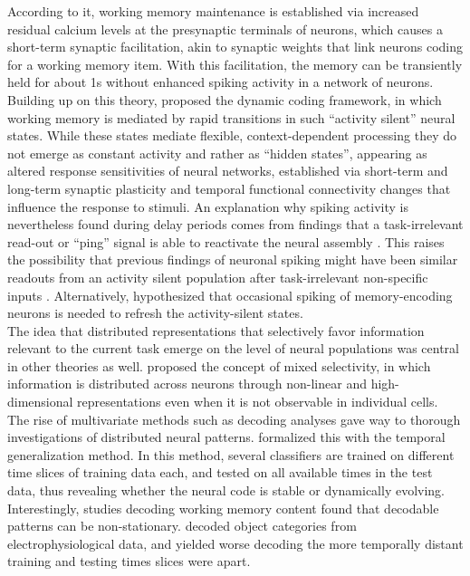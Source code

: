 According to it, working memory maintenance is established via increased residual calcium levels at the presynaptic terminals of neurons, which causes a short-term synaptic facilitation, akin to synaptic weights that link neurons coding for a working memory item.
With this facilitation, the memory can be transiently held for about 1s without enhanced spiking activity in a network of neurons.
Building up on this theory,  \citet{stokes2015activity} proposed the dynamic coding framework, in which working memory is mediated by rapid transitions in such ``activity silent'' neural states.
While these states mediate flexible, context-dependent processing they do not emerge as constant activity and rather as ``hidden states'', appearing as altered response sensitivities of neural networks, established via short-term and long-term synaptic plasticity and temporal functional connectivity changes that influence the response to stimuli.
An explanation why spiking activity is nevertheless found during delay periods comes from findings that a task-irrelevant read-out or ``ping'' signal is able to reactivate the neural assembly \citep{trubutschek2017theory}.
This raises the possibility that previous findings of neuronal spiking might have been similar readouts from an activity silent population after task-irrelevant non-specific inputs \citep{wolff2017dynamic}.
Alternatively, \citet{fiebig2017spiking} hypothesized that occasional spiking of memory-encoding neurons is needed to refresh the activity-silent states.\\
The idea that distributed representations that selectively favor information relevant to the current task emerge on the level of neural populations was central in other theories as well.
\citet{rigotti2013importance} proposed the concept of mixed selectivity, in which information is distributed across neurons through non-linear and high-dimensional representations even when it is not observable in individual cells.
The rise of multivariate methods such as decoding analyses gave way to thorough investigations of distributed neural patterns.
\citet{king2014characterizing} formalized this with the temporal generalization method.
In this method, several classifiers are trained on different time slices of training data each, and tested on all available times in the test data, thus revealing whether the neural code is stable or dynamically evolving.
Interestingly, studies decoding working memory content found that decodable patterns can be non-stationary.
\citet{meyers2008dynamic} decoded object categories from electrophysiological data, and yielded worse decoding the more temporally distant training and testing times slices were apart.
